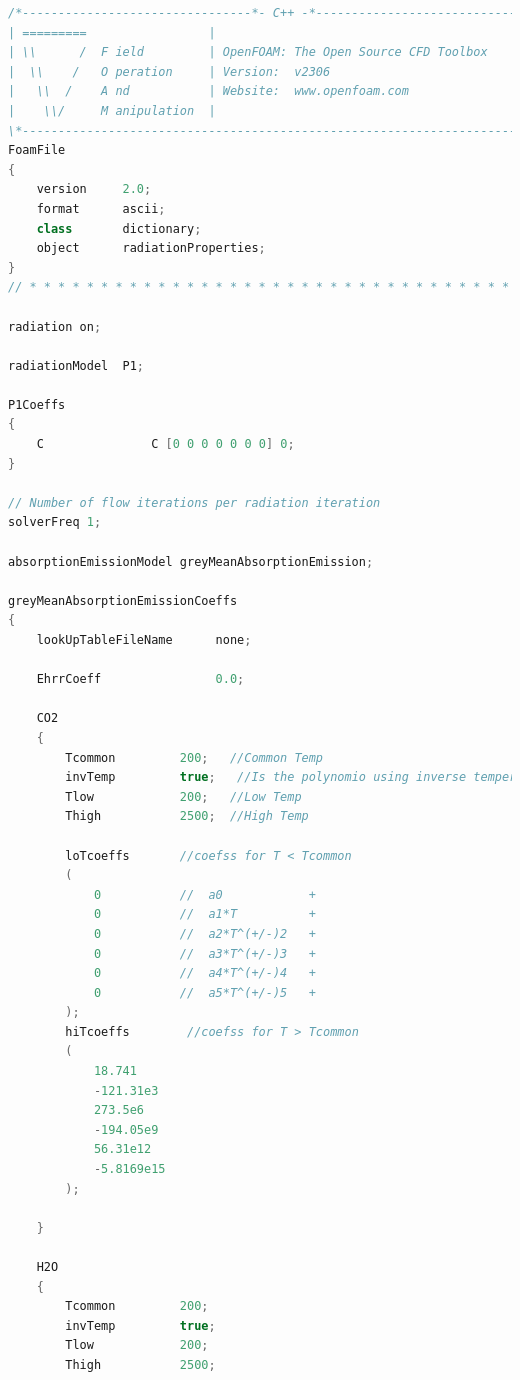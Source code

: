 \begin{lstlisting}[language=C++, caption={radiationProperties}]
/*--------------------------------*- C++ -*----------------------------------*\
| =========                 |                                                 |
| \\      /  F ield         | OpenFOAM: The Open Source CFD Toolbox           |
|  \\    /   O peration     | Version:  v2306                                 |
|   \\  /    A nd           | Website:  www.openfoam.com                      |
|    \\/     M anipulation  |                                                 |
\*---------------------------------------------------------------------------*/
FoamFile
{
    version     2.0;
    format      ascii;
    class       dictionary;
    object      radiationProperties;
}
// * * * * * * * * * * * * * * * * * * * * * * * * * * * * * * * * * * * * * //

radiation on;

radiationModel  P1;

P1Coeffs
{
    C               C [0 0 0 0 0 0 0] 0;
}

// Number of flow iterations per radiation iteration
solverFreq 1;

absorptionEmissionModel greyMeanAbsorptionEmission;

greyMeanAbsorptionEmissionCoeffs
{
    lookUpTableFileName      none;

    EhrrCoeff                0.0;

    CO2
    {
        Tcommon         200;   //Common Temp
        invTemp         true;   //Is the polynomio using inverse temperature.
        Tlow            200;   //Low Temp
        Thigh           2500;  //High Temp

        loTcoeffs       //coefss for T < Tcommon
        (
            0           //  a0            +
            0           //  a1*T          +
            0           //  a2*T^(+/-)2   +
            0           //  a3*T^(+/-)3   +
            0           //  a4*T^(+/-)4   +
            0           //  a5*T^(+/-)5   +
        );
        hiTcoeffs        //coefss for T > Tcommon
        (
            18.741
            -121.31e3
            273.5e6
            -194.05e9
            56.31e12
            -5.8169e15
        );

    }

    H2O
    {
        Tcommon         200;
        invTemp         true;
        Tlow            200;
        Thigh           2500;


\end{lstlisting}
